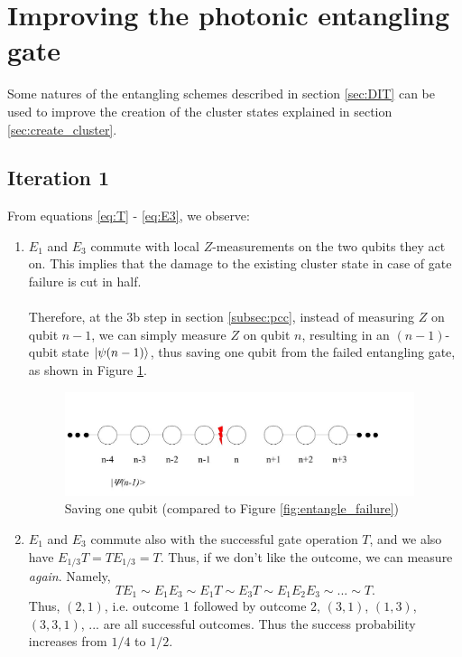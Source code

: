 \documentclass[letterpaper,10pt]{article}
\begin{document}
\section{Improving the photonic entangling gate}
Some natures of the entangling schemes described in section \ref{sec:DIT} can be used to improve the creation of the cluster states explained in section \ref{sec:create_cluster}.
\subsection{Iteration 1}
\label{subsec:iteration1}
From equations \ref{eq:T} - \ref{eq:E3}, we observe:
\begin{enumerate}
	\item 
	$E_1$ and $E_3$ commute with local $Z$-measurements on the two qubits they act on. This implies that the damage to the existing cluster state in case of gate failure is cut in half. \\ \\
	Therefore, at the 3b step in section \ref{subsec:pcc}, instead of measuring $Z$ on qubit $n-1$, we can simply measure $Z$ on qubit $n$, resulting in an $(n-1)$-qubit state $\Ket{\psi(n-1)}$, thus saving one qubit from the failed entangling gate, as shown in Figure \ref{fig:entangle_failure_improve}.
	\begin{figure}[h]
	\centering
         \includegraphics[height=1.2in]{entangling_4.jpg}
         \caption{Saving one qubit (compared to Figure \ref{fig:entangle_failure})}
         \label{fig:entangle_failure_improve}
	\end{figure}
	
	\item
	$E_1$ and $E_3$ commute also with the successful gate operation $T$, and we also have $E_{1/3}T=TE_{1/3}=T$. Thus, if we don’t like the outcome, we can measure \emph{again}. Namely,
	\begin{equation*}
		TE_1\sim E_1E_3\sim E_1T\sim E_3T\sim E_1E_2E_3\sim ... \sim T.
	\end{equation*}
	Thus, $(2, 1)$, i.e. outcome 1 followed by outcome 2, $(3, 1)$, $(1, 3)$, $(3, 3, 1)$, ... are all successful outcomes. Thus the success probability increases from $1/4$ to $1/2$.
\end{enumerate}
\end{document}
